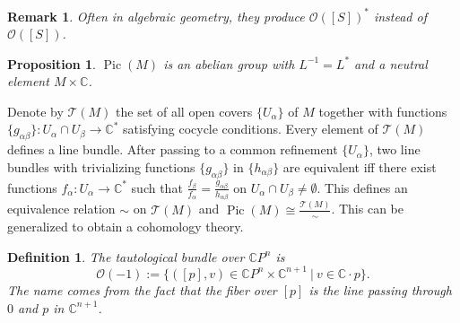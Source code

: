 \documentclass[10pt, a4paper]{article}
\newtheorem{proposition}[thm]{Proposition}
\newtheorem{defi}[thm]{Definition}
\newenvironment{noticeB}{%
  \tcolorbox[%
  notitle,
  empty,
  enhanced,  %
  breakable,
  coltext=black,
  colback=white, 
  fontupper=\rmfamily,
  noparskip,
  sharp corners,
  boxrule=-1pt,  %
  frame hidden,
  left=7pt,  %
  right=7pt,
  top=5pt,
  bottom=5pt,
  before skip=2.5ex plus 2pt,
  after skip=2.5ex plus 2pt,
  borderline west = {1.5pt}{-0.1pt}{blue!30!black}, %
  overlay unbroken and last={%
    \draw[color=black, line width=1.25pt]
    ($(frame.south west)+(1.pt, -0.1pt)$) -- ++(2em, 0);
  }
  ]}
{\endtcolorbox}
\newenvironment{definition}{\begin{noticeB}\begin{defi}}{%
    \end{defi}\end{noticeB}}
\newtheorem*{remark}{Remark}
\newcommand{\C}{\mathbb {C}}
\DeclareMathOperator{\pic}{Pic}
\begin{document}
\begin{remark}
  Often in algebraic geometry, they produce $\mathcal{O} ([S])^*$ instead of $\mathcal{O} ([S])$.
\end{remark}

\begin{proposition}
  $\pic (M)$ is an abelian group with $L^{-1} = L^*$ and a neutral element $M \times \C$.
\end{proposition}

Denote by $\mathcal{T} (M)$ the set of all open covers $\{U_\alpha\}$ of $M$ together with functions 
$\{g_{\alpha \beta}\}: U_\alpha \cap U_\beta \to \C^*$ satisfying cocycle conditions.
Every element of $\mathcal{T} (M)$ defines a line bundle.
After passing to a common refinement $\{U_\alpha\}$,
two line bundles with trivializing functions $\{g_{\alpha \beta}\}$ in $\{h_{\alpha \beta}\}$ are equivalent iff 
there exist functions $f_\alpha: U_\alpha \to \C^*$ such that $\frac{f_\beta}{f_\alpha} = \frac{g_{\alpha \beta}}{h_{\alpha \beta}}$ on $U_\alpha \cap U_\beta \neq \emptyset$.
This defines an equivalence relation $\sim$ on $\mathcal{T}(M)$ and $\pic (M) \cong \frac{\mathcal{T}(M)}{\sim}$.
This can be generalized to obtain a cohomology theory.

\begin{definition}
  The tautological bundle over $\C P^n$ is 
  $$\mathcal{O} (-1) := \{([p], v) \in \C P^n \times \C^{n + 1}\ |\ v \in \C \cdot p\}.$$
  The name comes from the fact that the fiber over $[p]$ is the line passing through $0$ and $p$ in $\C^{n + 1}$.
\end{definition}
  
\end{document}
